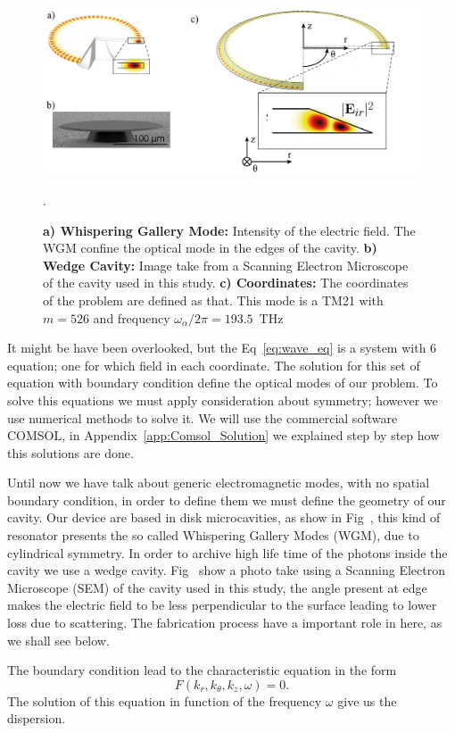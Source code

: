 \begin{figure}[b!]
    \centering
    \includegraphics[width =16cm]{Dissertation_wgm.jpg}
    \caption{\textbf{a) Whispering Gallery Mode:} Intensity of the electric field. The WGM confine the optical mode in the edges of the cavity. \textbf{b) Wedge Cavity:} Image take from a Scanning Electron Microscope of the cavity used in this study. \textbf{c) Coordinates:} The coordinates of the problem are defined as that. This mode is a TM21 with $m = 526$ and frequency $\omega_\alpha/2\pi = 193.5$~THz}.
    \label{fig:wgm}
\end{figure}
It might be have been overlooked, but the Eq~\ref{eq:wave_eq} is a system with 6 equation; one for which field in each coordinate. The solution for this set of equation with boundary condition define the optical modes of our problem. To solve this equations we must apply consideration about symmetry; however we use numerical methods to solve it. We will use the commercial software COMSOL\regmark, in Appendix~\ref{app:Comsol_Solution} we explained step by step how this solutions are done. 

Until now we have talk about generic electromagnetic modes, with no spatial boundary condition, in order to define them we must define the geometry of our cavity. Our device are based in disk microcavities, as show in Fig~, this kind of resonator presents the so called Whispering Gallery Modes (WGM), due to cylindrical symmetry. In order to archive high life time of the photons inside the cavity we use a wedge cavity. Fig~ show a photo take using a Scanning Electron Microscope (SEM) of the cavity used in this study, the angle present at edge makes the electric field to be less perpendicular to the surface leading to lower loss due to scattering\needcit. The fabrication process have a important role in here, as we shall see below. 

The boundary condition lead to the characteristic equation in the form 
\begin{equation}
    F(k_r,k_\theta,k_z,\omega) = 0.
    \label{eq:char_eq}
\end{equation}
The solution of this equation in function of the frequency $\omega$ give us the dispersion. 

